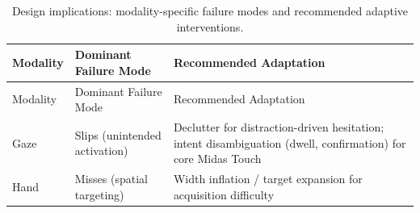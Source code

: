 \documentclass[
  11pt,
  11pt,
  letterpaper]{article}
\begin{document}
\begin{longtable}[]{@{}
  >{\raggedright\arraybackslash}p{}
  >{\raggedright\arraybackslash}p{}
  >{\raggedright\arraybackslash}p{}@{}}
\caption{Design implications: modality-specific failure modes and
recommended adaptive
interventions.}\label{tbl-design-implications}\tabularnewline
\toprule\noalign{}
\begin{minipage}[b]{\linewidth}\raggedright
Modality
\end{minipage} & \begin{minipage}[b]{\linewidth}\raggedright
Dominant Failure Mode
\end{minipage} & \begin{minipage}[b]{\linewidth}\raggedright
Recommended Adaptation
\end{minipage} \\
\midrule\noalign{}
\endfirsthead
\toprule\noalign{}
\begin{minipage}[b]{\linewidth}\raggedright
Modality
\end{minipage} & \begin{minipage}[b]{\linewidth}\raggedright
Dominant Failure Mode
\end{minipage} & \begin{minipage}[b]{\linewidth}\raggedright
Recommended Adaptation
\end{minipage} \\
\midrule\noalign{}
\endhead
\bottomrule\noalign{}
\endlastfoot
Gaze & Slips (unintended activation) & Declutter for distraction-driven
hesitation; intent disambiguation (dwell, confirmation) for core Midas
Touch \\
Hand & Misses (spatial targeting) & Width inflation / target expansion
for acquisition difficulty \\
\end{longtable}
\end{document}
